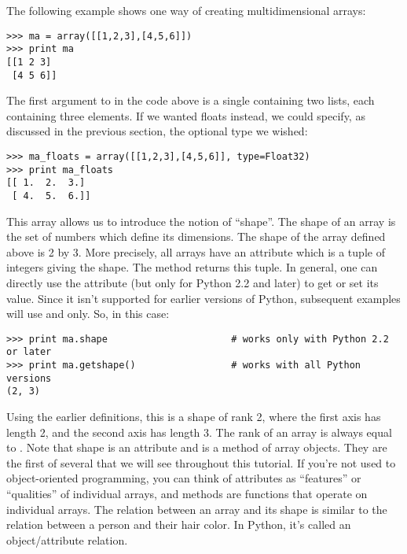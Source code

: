 The following example shows one way of creating multidimensional arrays:
\begin{verbatim}
>>> ma = array([[1,2,3],[4,5,6]])
>>> print ma
[[1 2 3]
 [4 5 6]]
\end{verbatim}
The first argument to  in the code above is a single
 containing two lists, each containing three elements. If we wanted
floats instead, we could specify, as discussed in the previous section, the
optional type we wished:
\begin{verbatim}
>>> ma_floats = array([[1,2,3],[4,5,6]], type=Float32)
>>> print ma_floats
[[ 1.  2.  3.]
 [ 4.  5.  6.]]
\end{verbatim}
This array allows us to introduce the notion of ``shape''. The
shape of an array is the set of numbers which define its dimensions. The shape
of the array  defined above is 2 by 3. More precisely, all arrays have
an attribute which is a tuple of integers giving the shape. The
 method returns this tuple.  In general, one
can directly use the  attribute (but only for Python 2.2 and
later) to get or set its value. Since it isn't supported for earlier versions
of Python, subsequent examples will use  and
 only. So, in this case:
\begin{verbatim}
>>> print ma.shape                      # works only with Python 2.2 or later
>>> print ma.getshape()                 # works with all Python versions
(2, 3)
\end{verbatim}
Using the earlier definitions, this is a shape of rank 2, where the
first axis has length 2, and the second axis has length 3. The rank of an array
 is always equal to .  Note that shape is an
attribute and  is a method of array objects. They are the
first of several that we will see throughout this tutorial. If you're not used
to object-oriented programming, you can think of attributes as ``features'' or
``qualities'' of individual arrays, and methods are functions that operate on
individual arrays.  The relation between an array and its shape is similar to
the relation between a person and their hair color. In Python, it's called an
object/attribute relation.

